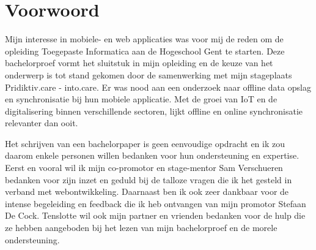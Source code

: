
\chapter*{Voorwoord}
\label{ch:voorwoord}


Mijn interesse in mobiele- en web applicaties was voor mij de reden om de opleiding Toegepaste Informatica aan de Hogeschool Gent te starten. Deze bachelorproef vormt het sluitstuk in mijn opleiding en de keuze van het onderwerp is tot stand gekomen door de samenwerking met mijn stageplaats Pridiktiv.care - into.care. Er was nood aan een onderzoek naar offline data opslag en synchronisatie bij hun mobiele applicatie. Met de groei van IoT en de digitalisering binnen verschillende sectoren, lijkt offline en online synchronisatie relevanter dan ooit.

Het schrijven van een bachelorpaper is geen eenvoudige opdracht en ik zou daarom enkele personen willen bedanken voor hun ondersteuning en expertise. Eerst en vooral wil ik mijn co-promotor en stage-mentor Sam Verschueren bedanken voor zijn inzet en geduld bij de talloze vragen die ik het gesteld in verband met webontwikkeling. Daarnaast ben ik ook zeer dankbaar voor de intense begeleiding en feedback die ik heb ontvangen van mijn promotor Stefaan De Cock. Tenslotte wil ook mijn partner en vrienden bedanken voor de hulp die ze hebben aangeboden bij het lezen van mijn bachelorproef en de morele ondersteuning.